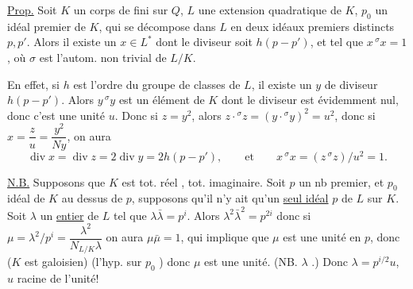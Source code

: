 
\uline{Prop.} Soit $K$ un corps de  fini sur $Q$, $L$ une extension quadratique de $K$, $p_0$ un idéal premier de $K$,  qui se décompose dans $L$ en deux idéaux premiers distincts $p,p'$. Alors il existe un $x\in L^*$   dont le diviseur soit $h(p-p')$,  et tel que $x\,{}^\sigma x=1$, où $\sigma$ est l'autom. non trivial de $L/K$.


En effet,  si $h$ est l'ordre du groupe de classes  de $L$, il existe un $y$ de diviseur $h(p-p')$. Alors $y\,{}^\sigma y$ est un élément de $K$ dont le diviseur est évidemment nul, donc c'est une unité $u$.
Donc si $z=y^2$, alors  $z\cdot{}^\sigma z=(y\cdot{}^\sigma y)^2=u^2$, donc si $x=\dfrac{z}{u}=\dfrac{y^2}{Ny}$, on aura
\[
\operatorname{div}x=\operatorname{div}z=2\operatorname{div}y=2h(p-p'),\qquad\text{et}\qquad x\,{}^\sigma x=(z\,{}^\sigma z)/u^2=1.
\]

\uline{N.B.} Supposons que $K$ est tot. réel ,    tot. imaginaire. Soit $p$ un nb premier, et $p_0$ idéal de $K$ au dessus de $p$, supposons qu'il n'y ait qu'un \uline{seul idéal}  $p$  de $L$ sur $K$. Soit $\lambda$ un \uline{entier} de $L$ tel que $\lambda\bar\lambda=p^i$. Alors $\lambda^2\bar\lambda^2=p^{2i}$ donc si $\mu=\lambda^2/p^i=\dfrac{\lambda^2}{N_{L/K}\lambda}$ on aura $\mu\bar\mu=1$,  qui implique que $\mu$ est une unité en $p$, donc ($K$ est galoisien)  (l'hyp. sur $p_0$ ) donc $\mu$ est une unité. (NB. $\lambda$ .) Donc $\lambda=p^{i/2}u$, $u$ racine de l'unité!

